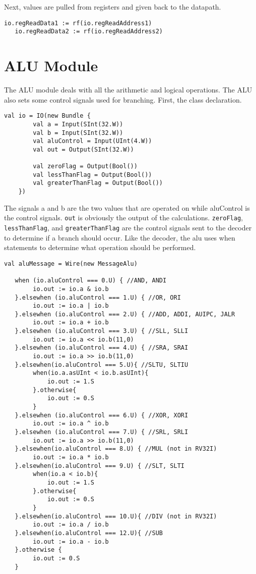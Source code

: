 \documentclass[12pt, letterpaper]{report}
\begin{document}
Next, values are pulled from registers and given back to the datapath. 

\begin{lstlisting}[style=scala]
   io.regReadData1 := rf(io.regReadAddress1)
   io.regReadData2 := rf(io.regReadAddress2)
\end{lstlisting}

\section{ALU Module}
The ALU module deals with all the arithmetic and logical operations. The ALU also sets some control signals
used for branching. First, the class declaration. 

\begin{lstlisting}[style=scala]
   val io = IO(new Bundle {
        val a = Input(SInt(32.W))
        val b = Input(SInt(32.W))
        val aluControl = Input(UInt(4.W))
        val out = Output(SInt(32.W))
        
        val zeroFlag = Output(Bool())
        val lessThanFlag = Output(Bool())
        val greaterThanFlag = Output(Bool())
    })
\end{lstlisting}

\noindent The signals a and b are the two values that are operated on while aluControl is the control signals. \verb|out|
is obviously the output of the calculations. \verb|zeroFlag|, \verb|lessThanFlag|, and \verb|greaterThanFlag| are the control signals sent to the decoder to determine if a branch should occur. Like the decoder, the alu uses when statements to determine what operation should be performed.


\begin{lstlisting}[style=scala]
   val aluMessage = Wire(new MessageAlu)
   
   when (io.aluControl === 0.U) { //AND, ANDI
   		io.out := io.a & io.b
   }.elsewhen (io.aluControl === 1.U) { //OR, ORI
   		io.out := io.a | io.b
   }.elsewhen (io.aluControl === 2.U) { //ADD, ADDI, AUIPC, JALR
   		io.out := io.a + io.b                           
   }.elsewhen (io.aluControl === 3.U) { //SLL, SLLI
   		io.out := io.a << io.b(11,0)
   }.elsewhen (io.aluControl === 4.U) { //SRA, SRAI
   		io.out := io.a >> io.b(11,0)
   }.elsewhen(io.aluControl === 5.U){ //SLTU, SLTIU
   		when(io.a.asUInt < io.b.asUInt){
   			io.out := 1.S
   		}.otherwise{
   			io.out := 0.S
   		}
   }.elsewhen (io.aluControl === 6.U) { //XOR, XORI
   		io.out := io.a ^ io.b
   }.elsewhen (io.aluControl === 7.U) { //SRL, SRLI
   		io.out := io.a >> io.b(11,0)
   }.elsewhen(io.aluControl === 8.U) { //MUL (not in RV32I)
   		io.out := io.a * io.b
   }.elsewhen(io.aluControl === 9.U) { //SLT, SLTI
   		when(io.a < io.b){
   			io.out := 1.S
   		}.otherwise{
   			io.out := 0.S
   		}
   }.elsewhen(io.aluControl === 10.U){ //DIV (not in RV32I)
   		io.out := io.a / io.b
   }.elsewhen(io.aluControl === 12.U){ //SUB
   		io.out := io.a - io.b
   }.otherwise {
   		io.out := 0.S
   }
\end{lstlisting}
\end{document}
